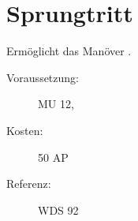 \section{Sprungtritt}
\label{sf.sprungtritt}
Ermöglicht das Manöver .
\begin{description}
    \item[Voraussetzung:]
        MU 12, 
    \item [Kosten:]
        50 AP
    \item [Referenz:]
        WDS 92
\end{description}
